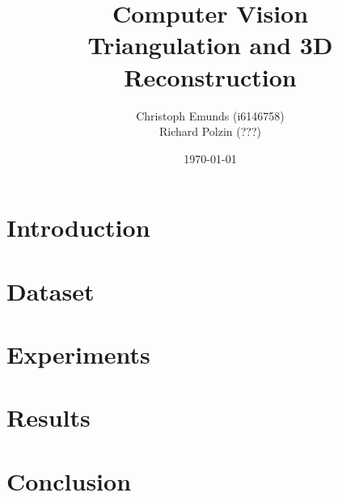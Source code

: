 \documentclass[10pt,a4paper]{article}
\author{Christoph Emunds (i6146758)\\Richard Polzin (???)}
\title{Computer Vision\\Triangulation and 3D Reconstruction}
\date{\today}
\begin{document}
	\maketitle
	
	\tableofcontents
	
	\section{Introduction}
	
	\section{Dataset}
	
	\section{Experiments}
	
	\section{Results}
	
	\section{Conclusion}
	
\end{document}
